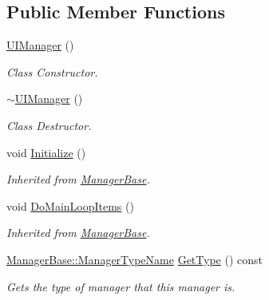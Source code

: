 \subsection*{Public Member Functions}
\begin{DoxyCompactItemize}
\item 
\hyperlink{classphys_1_1UIManager_aeb502f11f170efd806b4153923c55359}{UIManager} ()
\begin{DoxyCompactList}\small\item\em Class Constructor. \item\end{DoxyCompactList}\item 
\hyperlink{classphys_1_1UIManager_a203144f08dbaf8068746359c22aa4f1e}{$\sim$UIManager} ()
\begin{DoxyCompactList}\small\item\em Class Destructor. \item\end{DoxyCompactList}\item 
\hypertarget{classphys_1_1UIManager_af04e60c4f09c114ec3bf32babdb64ab7}{
void \hyperlink{classphys_1_1UIManager_af04e60c4f09c114ec3bf32babdb64ab7}{Initialize} ()}
\label{d5/dc5/classphys_1_1UIManager_af04e60c4f09c114ec3bf32babdb64ab7}

\begin{DoxyCompactList}\small\item\em Inherited from \hyperlink{classphys_1_1ManagerBase}{ManagerBase}. \item\end{DoxyCompactList}\item 
\hypertarget{classphys_1_1UIManager_a972abedcd4343dc5966580f2f82494a8}{
void \hyperlink{classphys_1_1UIManager_a972abedcd4343dc5966580f2f82494a8}{DoMainLoopItems} ()}
\label{d5/dc5/classphys_1_1UIManager_a972abedcd4343dc5966580f2f82494a8}

\begin{DoxyCompactList}\small\item\em Inherited from \hyperlink{classphys_1_1ManagerBase}{ManagerBase}. \item\end{DoxyCompactList}\item 
\hyperlink{classphys_1_1ManagerBase_aaa6ccddf23892eaccb898529414f80a5}{ManagerBase::ManagerTypeName} \hyperlink{classphys_1_1UIManager_ab8fe74564ca5dc09cbe4b1cc2c007e79}{GetType} () const 
\begin{DoxyCompactList}\small\item\em Gets the type of manager that this manager is. \item\end{DoxyCompactList}\end{DoxyCompactItemize}

